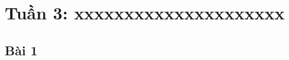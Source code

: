 \documentclass{article}
\begin{document}
\tableofcontents
\newpage
\listoffigures
\newpage
\section{Tuần 3: xxxxxxxxxxxxxxxxxxxxx}
\subsection{Bài 1}







\end{document}

